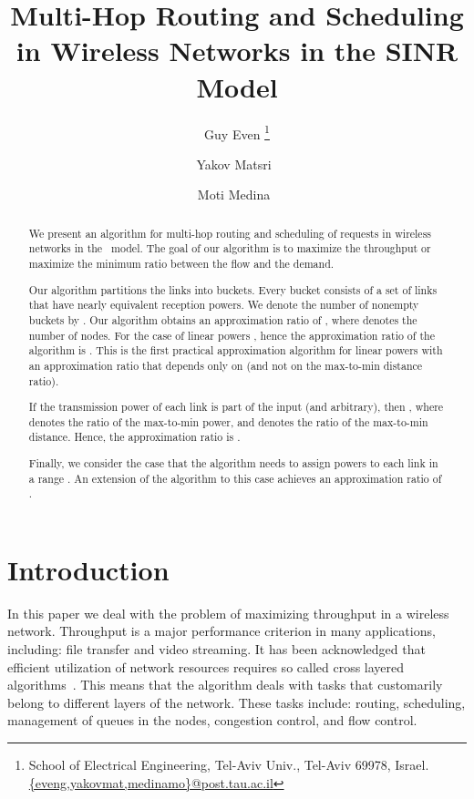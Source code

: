 \documentclass[11pt]{article}
\newenvironment{proof sketch}{\noindent {\bf Proof sketch:} }{\hfill \qed}
\newcommand{\sinr}{\text{\sc{sinr}}}
\begin{document}
\title{Multi-Hop Routing and Scheduling in Wireless Networks in the SINR Model}

\author{Guy Even
\thanks{School of Electrical Engineering,
Tel-Aviv Univ., Tel-Aviv 69978, Israel.
\protect\url{{eveng,yakovmat,medinamo}@post.tau.ac.il}}
\and
Yakov Matsri~
\and
Moti Medina~
\date{}
}
\maketitle \date{}




\begin{abstract}
  We present an algorithm for multi-hop routing and scheduling of
  requests in wireless networks in the \sinr\ model. The goal of our
  algorithm is to maximize the throughput or maximize the minimum
  ratio between the flow and the demand.

  Our algorithm partitions the links into buckets.  Every bucket
  consists of a set of links that have nearly equivalent reception
  powers.  We denote the number of nonempty buckets by .  Our
  algorithm obtains an approximation ratio of , where  denotes the number of nodes.  For the case of linear
  powers , hence the approximation ratio of the algorithm
  is .  This is the first practical approximation algorithm
  for linear powers with an approximation ratio that depends only on
   (and not on the max-to-min distance ratio).

  If the transmission power of each link is part of the input (and
  arbitrary), then , where
   denotes the ratio of the max-to-min power, and 
  denotes the ratio of the max-to-min distance.  Hence, the
  approximation ratio is .

  Finally, we consider the case that the algorithm needs to assign
  powers to each link in a range . An extension of the
  algorithm to this case achieves an approximation ratio of .

\end{abstract}
\begin{comment}

  \paragraph{ Keywords:}
\end{comment}








\section{Introduction}
In this paper we deal with the problem of maximizing throughput in a
wireless network.  Throughput is a major performance criterion in many
applications, including: file transfer and video streaming.  It has
been acknowledged that efficient utilization of network resources
requires so called cross layered algorithms~\cite{lin2006tutorial}.
This means that the algorithm deals with tasks that customarily belong
to different layers of the network. These tasks include: routing,
scheduling, management of queues in the nodes, congestion control, and flow control.
\end{document}

